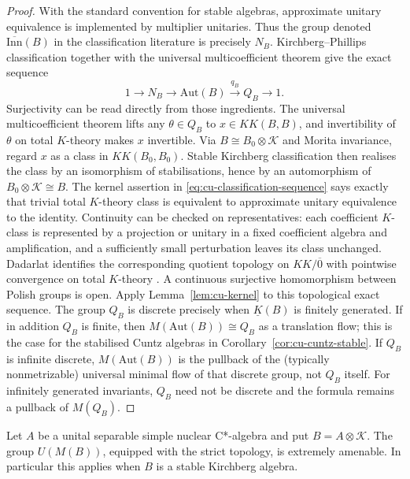 \begin{proof}
With the standard convention for stable algebras, approximate unitary
equivalence is implemented by multiplier unitaries. Thus the group denoted $\overline{\mathrm{Inn}}(B)$ in the classification literature is precisely $N_B$. Kirchberg--Phillips classification together with the universal
multicoefficient theorem \cite{KirchbergPhillips2000,Phillips2000,RosenbergSchochet1987,DadarlatLoring1996,Dadarlat2005} give the exact
sequence 
\begin{equation}  \label{eq:cu-classification-sequence}
1\longrightarrow N_B\longrightarrow\mathrm{Aut}(B) \xrightarrow{q_B}Q_B\longrightarrow1.
\end{equation}
Surjectivity can be read directly from those ingredients. The universal
multicoefficient theorem lifts any $\theta\in Q_B$ to $x\in KK(B,B)$, and
invertibility of $\theta$ on total $K$-theory makes $x$ invertible. Via $B\cong B_0\otimes\mathcal{K}$ and Morita invariance, regard $x$ as a class
in $KK(B_0,B_0)$. Stable Kirchberg classification \cite[Theorem 4.2.1]{Phillips2000} then realises the class by an isomorphism of stabilisations,
hence by an automorphism of $B_0\otimes\mathcal{K}\cong B$. The kernel
assertion in \eqref{eq:cu-classification-sequence} says exactly that trivial
total $K$-theory class is equivalent to approximate unitary equivalence to
the identity. Continuity can be checked on representatives: each coefficient 
$K$-class is represented by a projection or unitary in a fixed coefficient
algebra and amplification, and a sufficiently small perturbation leaves its
class unchanged. Dadarlat identifies the corresponding quotient topology on $KK/\overline 0$ with pointwise convergence on total $K$-theory \cite[Theorem
4.1(b)]{Dadarlat2005}. A continuous surjective homomorphism between Polish
groups is open. Apply Lemma~\ref{lem:cu-kernel} to this topological exact
sequence. The group $Q_B$ is discrete precisely when $\underline K(B)$ is
finitely generated. If in addition $Q_B$ is finite, then $M(\mathrm{Aut}(B))\cong Q_B$ as a translation flow; this is the case for the stabilised
Cuntz algebras in Corollary~\ref{cor:cu-cuntz-stable}. If $Q_B$ is infinite
discrete, $M(\mathrm{Aut}(B))$ is the pullback of the (typically
nonmetrizable) universal minimal flow of that discrete group, not $Q_B$
itself. For infinitely generated invariants, $Q_B$ need not be discrete and
the formula remains a pullback of $M(Q_B)$.
\end{proof}

\begin{lemma}\label{lem:cu-strict-ea}
 Let $A$ be a unital separable simple nuclear C*-algebra and put $B=A\otimes\mathcal{K}$. The group $U(M(B))$, equipped with
the strict topology, is extremely amenable. In particular this applies when $B$ is a stable Kirchberg algebra.
\end{lemma}


